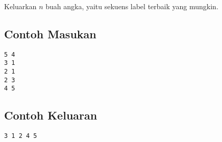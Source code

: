\documentclass{article}
\begin{document}
Keluarkan $n$ buah angka, yaitu sekuens label terbaik yang mungkin. 
\\

\begin{multicols}{2}
\subsection*{Contoh Masukan}
\begin{lstlisting}
5 4
3 1
2 1
2 3
4 5
\end{lstlisting}
\columnbreak
\subsection*{Contoh Keluaran}
\begin{lstlisting}
3 1 2 4 5 
\end{lstlisting}
\vfill
\null
\end{multicols}


\pagebreak
\end{document}
